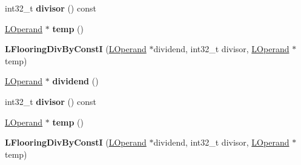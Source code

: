 \begin{DoxyCompactItemize}
\item 
int32\+\_\+t {\bfseries divisor} () const \hypertarget{classv8_1_1internal_1_1_l_flooring_div_by_const_i_af9d8b07c5bf6feee1c070b62089c5bd2}{}\label{classv8_1_1internal_1_1_l_flooring_div_by_const_i_af9d8b07c5bf6feee1c070b62089c5bd2}

\item 
\hyperlink{classv8_1_1internal_1_1_l_operand}{L\+Operand} $\ast$ {\bfseries temp} ()\hypertarget{classv8_1_1internal_1_1_l_flooring_div_by_const_i_afcfe0e19c33badfb035d72c047c00aa7}{}\label{classv8_1_1internal_1_1_l_flooring_div_by_const_i_afcfe0e19c33badfb035d72c047c00aa7}

\item 
{\bfseries L\+Flooring\+Div\+By\+ConstI} (\hyperlink{classv8_1_1internal_1_1_l_operand}{L\+Operand} $\ast$dividend, int32\+\_\+t divisor, \hyperlink{classv8_1_1internal_1_1_l_operand}{L\+Operand} $\ast$temp)\hypertarget{classv8_1_1internal_1_1_l_flooring_div_by_const_i_ae250f828f1300817ff62968952e8d1bf}{}\label{classv8_1_1internal_1_1_l_flooring_div_by_const_i_ae250f828f1300817ff62968952e8d1bf}

\item 
\hyperlink{classv8_1_1internal_1_1_l_operand}{L\+Operand} $\ast$ {\bfseries dividend} ()\hypertarget{classv8_1_1internal_1_1_l_flooring_div_by_const_i_afd6eec483f06b84f2130f69d1bdb0663}{}\label{classv8_1_1internal_1_1_l_flooring_div_by_const_i_afd6eec483f06b84f2130f69d1bdb0663}

\item 
int32\+\_\+t {\bfseries divisor} () const \hypertarget{classv8_1_1internal_1_1_l_flooring_div_by_const_i_af9d8b07c5bf6feee1c070b62089c5bd2}{}\label{classv8_1_1internal_1_1_l_flooring_div_by_const_i_af9d8b07c5bf6feee1c070b62089c5bd2}

\item 
\hyperlink{classv8_1_1internal_1_1_l_operand}{L\+Operand} $\ast$ {\bfseries temp} ()\hypertarget{classv8_1_1internal_1_1_l_flooring_div_by_const_i_afcfe0e19c33badfb035d72c047c00aa7}{}\label{classv8_1_1internal_1_1_l_flooring_div_by_const_i_afcfe0e19c33badfb035d72c047c00aa7}

\item 
{\bfseries L\+Flooring\+Div\+By\+ConstI} (\hyperlink{classv8_1_1internal_1_1_l_operand}{L\+Operand} $\ast$dividend, int32\+\_\+t divisor, \hyperlink{classv8_1_1internal_1_1_l_operand}{L\+Operand} $\ast$temp)\hypertarget{classv8_1_1internal_1_1_l_flooring_div_by_const_i_ae250f828f1300817ff62968952e8d1bf}{}\label{classv8_1_1internal_1_1_l_flooring_div_by_const_i_ae250f828f1300817ff62968952e8d1bf}


\end{DoxyCompactItemize}
